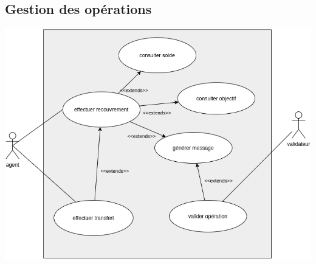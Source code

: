 		\subsection*{Gestion des opérations}
			\begin{center}
				\includegraphics[scale=0.5]{chap_2/gestion-operation.png}
				\label{Gestion des opérations}
			\end{center}
